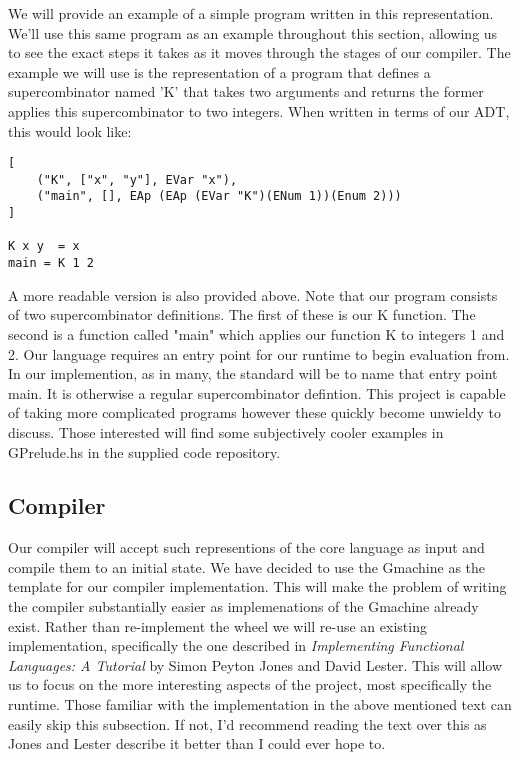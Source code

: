 We will provide an example of a simple program written in this
representation. We'll use this same program as an example 
throughout this section, allowing us to see the exact steps it
takes as it moves through the stages of our compiler. The 
example we will use is the representation of a program that 
defines a supercombinator named 'K' that takes two arguments 
and returns the former applies this supercombinator to two 
integers. When written in terms of our ADT, this would look
like:

\begin{verbatim}
[
	("K", ["x", "y"], EVar "x"), 
 	("main", [], EAp (EAp (EVar "K")(ENum 1))(Enum 2)))
]

K x y  = x
main = K 1 2
\end{verbatim}

A more readable version is also provided above. Note that our
program consists of two supercombinator definitions. The first
of these is our K function. The second is a function called
"main" which applies our function K to integers 1 and 2. Our
language requires an entry point for our runtime to begin
evaluation from. In our implemention, as in many, the standard
will be to name that entry point main. It is otherwise a 
regular supercombinator defintion. This project is capable of
taking more complicated programs however these quickly become
unwieldy to discuss. Those interested will find some subjectively
cooler examples in GPrelude.hs in the supplied code repository.

\subsection{Compiler}
Our compiler will accept such representions of the core language
as input and compile them to an initial state. We have
decided to use the Gmachine as the template for our compiler
implementation. This will make the problem of writing the compiler
substantially easier as implemenations of the Gmachine already
exist. Rather than re-implement the wheel we will re-use an 
existing implementation, specifically the one described in 
\emph{Implementing Functional Languages: A Tutorial} by Simon
Peyton Jones and David Lester. This will allow us to focus on
the more interesting aspects of the project, most specifically
the runtime. Those familiar with the implementation in the 
above mentioned text can easily skip this subsection. If not, 
I'd recommend reading the text over this as Jones and Lester 
describe it better than I could ever hope to.

